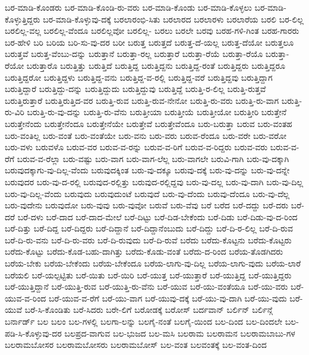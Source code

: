 {ಬರ-ಮಾಡಿ-ಕೊಂಡರು
ಬರ-ಮಾಡಿ-ಕೊಂಡಿ-ರು-ವರು
ಬರ-ಮಾಡಿ-ಕೊಂಡು
ಬರ-ಮಾಡಿ-ಕೊಳ್ಳಲು
ಬರ-ಮಾಡಿ-ಕೊಳ್ಳುತ್ತಿದ್ದರು
ಬರ-ಮಾಡಿ-ಕೊಳ್ಳುವು-ದಕ್ಕೆ
ಬರಲಾರಂಭಿ-ಸಿತು
ಬರಲಾರದ
ಬರಲಾರಳು
ಬರಲಾರೆಯ
ಬರಲಿ
ಬರ-ಲಿಲ್ಲ
ಬರಲಿಲ್ಲ-ವಲ್ಲ
ಬರಲಿಲ್ಲ-ವೆಂದೂ
ಬರಲಿಲ್ಲವೋ
ಬರಲಿಲ್ಲ-
ಬರಲು
ಬರಲೇ
ಬರವು
ಬರಹ-ಗಳಿ-ಗಿಂತ
ಬರಹ-ಗಾರರು
ಬರ-ಹೇಳಿ
ಬರಿ
ಬರಿಯ
ಬರಿ-ಸು-ವು-ದರ
ಬರೀ
ಬರುತ್ತ
ಬರುತ್ತದೆ
ಬರುತ್ತ-ದೆ-ಯಲ್ಲ
ಬರುತ್ತ-ದೆಯೋ
ಬರುತ್ತಲೂ
ಬರುತ್ತವೆ
ಬರುತ್ತ-ವೆಂಬು-ದನ್ನು
ಬರುತ್ತಾನೆ
ಬರುತ್ತಾ-ರಲ್ಲ
ಬರುತ್ತಾರೆ
ಬರುತ್ತಾ-ರೆಯೆ
ಬರುತ್ತಾ-ರೆಯೊ
ಬರುತ್ತಾ-ರೆಯೋ
ಬರುತ್ತಾರೊ
ಬರುತ್ತಿತ್ತು
ಬರುತ್ತಿದೆ
ಬರುತ್ತಿದ್ದ
ಬರುತ್ತಿದ್ದನು
ಬರುತ್ತಿದ್ದ-ರಂತೆ
ಬರುತ್ತಿದ್ದರು
ಬರುತ್ತಿದ್ದರೂ
ಬರುತ್ತಿದ್ದರೋ
ಬರುತ್ತಿದ್ದಳು
ಬರುತ್ತಿದ್ದ-ವನು
ಬರುತ್ತಿದ್ದ-ವ-ರಲ್ಲಿ
ಬರುತ್ತಿದ್ದ-ವರೆ
ಬರುತ್ತಿದ್ದವು
ಬರುತ್ತಿದ್ದಾಗ
ಬರುತ್ತಿದ್ದಾರೆ
ಬರುತ್ತಿದ್ದು-ದನ್ನು
ಬರುತ್ತಿದ್ದುದು
ಬರುತ್ತಿದ್ದುವು
ಬರುತ್ತಿದ್ದೆ
ಬರುತ್ತಿ-ರ-ಲಿಲ್ಲ
ಬರುತ್ತಿ-ರುತ್ತವೆ
ಬರುತ್ತಿರುತ್ತಾರೆ
ಬರುತ್ತಿರುತ್ತಿದ-ವರ
ಬರುತ್ತಿ-ರುವ
ಬರುತ್ತಿ-ರುವ-ನೇನೋ
ಬರುತ್ತಿ-ರು-ವರು
ಬರುತ್ತಿ-ರು-ವಾಗ
ಬರುತ್ತಿ-ರು-ವಿರಿ
ಬರುತ್ತಿ-ರು-ವು-ದನ್ನು
ಬರುತ್ತಿ-ರು-ವೆನು
ಬರುತ್ತೀಯಾ
ಬರುತ್ತೀಯೆ
ಬರುತ್ತೀಯೋ
ಬರುತ್ತೀರಿ
ಬರುತ್ತೇನೆ
ಬರುತ್ತೇನೆಂದು
ಬರುತ್ತೇನೆಂದೂ
ಬರುತ್ತೇನೆಯೇ
ಬರುತ್ತೇವೆ
ಬರುತ್ತೇವೆಂದೂ
ಬರು-ಬರುತ್ತಾ
ಬರುವ
ಬರು-ವಂತಹ
ಬರು-ವಂತಿಲ್ಲ
ಬರು-ವಂತೆ
ಬರು-ವಂತೆಯೇ
ಬರು-ವನು
ಬರು-ವರು
ಬರುವ-ರೆಂದೂ
ಬರು-ವರೇ
ಬರು-ವರೋ
ಬರು-ವಳು
ಬರುವಳೊ
ಬರುವ-ವರ
ಬರುವ-ವ-ರನ್ನು
ಬರುವ-ವ-ರಿಗೆ
ಬರುವ-ವ-ರಿದ್ದರು
ಬರುವ-ವರು
ಬರುವ-ವ-ರೆಗೆ
ಬರುವ-ವ-ರೆಲ್ಲಾ
ಬರು-ವಷ್ಟು
ಬರು-ವಾಗ
ಬರು-ವಾಗ-ಲೆಲ್ಲ
ಬರು-ವಾಗಲೇ
ಬರುವಿ-ಗಾಗಿ
ಬರು-ವು-ದಕ್ಕಾಗಿ
ಬರುವುದಕ್ಕಾಗು-ವು-ದಿಲ್ಲ-ವೆಂದು
ಬರುವುದಕ್ಕಿಂತ
ಬರು-ವು-ದಕ್ಕೂ
ಬರುವು-ದಕ್ಕೆ
ಬರು-ವು-ದನ್ನು
ಬರು-ವು-ದನ್ನೇ
ಬರುವುದರ
ಬರು-ವು-ದ-ರಲ್ಲಿ
ಬರುವುದ-ರಲ್ಲಿತ್ತು
ಬರುವುದ-ರಲ್ಲಿದ್ದವು
ಬರು-ವು-ದಲ್ಲ
ಬರು-ವು-ದಾಗಿ
ಬರು-ವು-ದಿಲ್ಲ
ಬರು-ವು-ದಿಲ್ಲ-ವೆಂದು
ಬರುವುದು
ಬರುವುದುಂಟೆ
ಬರುವುದೆ
ಬರು-ವು-ದೆಂದು
ಬರುವು-ದೆಂದೂ
ಬರು-ವು-ದೆಲ್ಲ
ಬರು-ವುದೇನು
ಬರುವುದೋ
ಬರು-ವುವು
ಬರು-ವುವೋ
ಬರುವೆ
ಬರು-ವೆವು
ಬರೆ
ಬರೆದ
ಬರೆ-ದದ್ದು
ಬರೆ-ದರು
ಬರೆ-ದರೆ
ಬರೆ-ದಳು
ಬರೆ-ದಾದ
ಬರೆ-ದಾದ-ಮೇಲೆ
ಬರೆ-ದಿಟ್ಟು
ಬರೆ-ದಿಡ-ಬೇಕೆಂದು
ಬರೆ-ದಿಡು
ಬರೆ-ದಿಡು-ವು-ದ-ರಿಂದ
ಬರೆ-ದಿತ್ತು
ಬರೆ-ದಿದ್ದ
ಬರೆ-ದಿದ್ದರು
ಬರೆ-ದಿದ್ದಾನೆ
ಬರೆ-ದಿದ್ದಾನೆಂಬುದು
ಬರೆ-ದಿದ್ದು
ಬರೆ-ದಿ-ರ-ಲಿಲ್ಲ
ಬರೆ-ದಿ-ರುವ
ಬರೆ-ದಿ-ರು-ವನು
ಬರೆ-ದಿ-ರು-ವರು
ಬರೆ-ದಿ-ರುವುದು
ಬರೆ-ದಿ-ರುವೆ
ಬರೆದು
ಬರೆದು-ಕೊಟ್ಟನು
ಬರೆದು-ಕೊಟ್ಟರು
ಬರೆದು-ಕೊಟ್ಟು
ಬರೆದು-ಕೊಡ-ಬಹು-ದಾಗಿತ್ತು
ಬರೆದು-ಕೊಡು-ವಂತೆ
ಬರೆದು-ದ-ರಿಂದ
ಬರೆಯ-ತೊಡಗಿದರು
ಬರೆಯ-ಬೇಕು
ಬರೆಯ-ಬೇಕೆಂದು
ಬರೆಯ-ಬೇಕೆಂದೂ
ಬರೆಯ-ಲಾಗು-ವು-ದಿಲ್ಲ
ಬರೆಯ-ಲಾಗು-ವುದು
ಬರೆಯ-ಲಾರೆ
ಬರೆಯಲಿ
ಬರೆ-ಯಲ್ಪಟ್ಟಿತು
ಬರೆ-ಯಿತು
ಬರೆ-ಯಿರಿ
ಬರೆ-ಯುತ್ತ
ಬರೆ-ಯುತ್ತಾರೆ
ಬರೆ-ಯುತ್ತಿದ್ದ
ಬರೆ-ಯುತ್ತಿದ್ದರು
ಬರೆ-ಯುತ್ತಿದ್ದಾನೆ
ಬರೆ-ಯುತ್ತಿ-ರುವ
ಬರೆ-ಯುತ್ತಿ-ರು-ವೆನು
ಬರೆ-ಯುವ
ಬರೆ-ಯು-ವಂತೆಯೂ
ಬರೆ-ಯು-ವರು
ಬರೆ-ಯುವ-ವ-ರಿಂದ
ಬರೆ-ಯುವ-ವ-ರೆಗೆ
ಬರೆ-ಯು-ವಾಗ
ಬರೆ-ಯುವು-ದಕ್ಕೆ
ಬರೆ-ಯು-ವು-ದಾಗಿ
ಬರೆ-ಯು-ವುದು
ಬರೆ-ಯುವೆ
ಬರೆ-ಸಿ-ಕೊಂಡಿತು
ಬರೆ-ಸಿದರು
ಬರೇ-ಲಿಗೆ
ಬರೋಡಕ್ಕೆ
ಬರೋಸ್
ಬರ್ದವಾನ್
ಬರ್ಲಿನ್
ಬರ್ಲಿನ್ಗೆ
ಬರ್ನಾರ್ಡ್
ಬಲ
ಬಲಂ
ಬಲ-ಗಳಲ್ಲಿ
ಬಲಗಾ-ಲನ್ನು
ಬಲಗೈ-ನಂತೆ
ಬಲಗೈ-ಯಿಂದ
ಬಲ-ದಿಂದ
ಬಲ-ದಿಂದಲೇ
ಬಲ-ಪಡಿ-ಸಿ-ಕೊಳ್ಳುವು-ದರ
ಬಲಪ್ರದ-ವಾಗುವ
ಬಲ-ಭುಜದ
ಬಲ-ಮಸಿ
ಬಲರಾಮ
ಬಲರಾಮನ
ಬಲರಾಮಬಾಬು-ಗಳ
ಬಲರಾಮಬೋಸರ
ಬಲರಾಮಬೋಸರು
ಬಲರಾಮಬೋಸ್
ಬಲ-ವಂತ
ಬಲವಂತಕ್ಕೆ
ಬಲ-ವಂತ-ದಿಂದ
}
